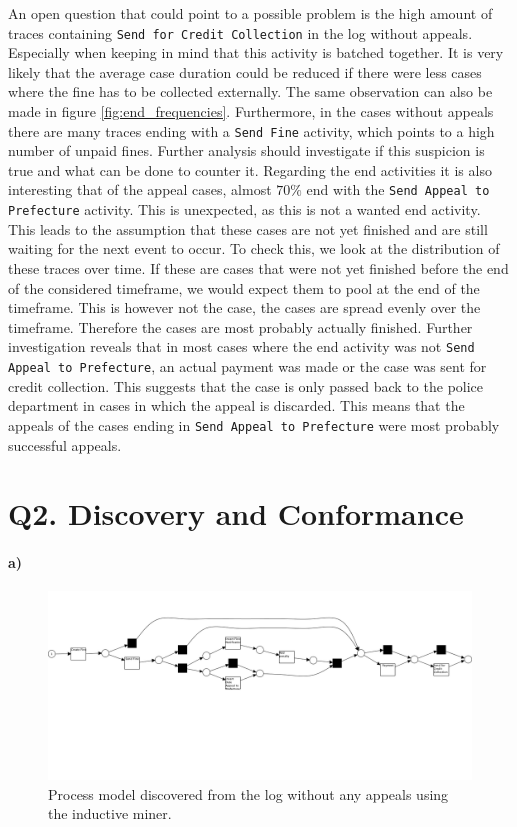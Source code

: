 \documentclass[12pt]{report}
\begin{document}
An open question that could point to a possible problem is the high amount of traces containing \texttt{Send for Credit Collection} in the log without appeals. Especially when keeping in mind that this activity is batched together. It is very likely that the average case duration could be reduced if there were less cases where the fine has to be collected externally. The same observation can also be made in figure \ref{fig:end_frequencies}. Furthermore, in the cases without appeals there are many traces ending with a \texttt{Send Fine} activity, which points to a high number of unpaid fines. Further analysis should investigate if this suspicion is true and what can be done to counter it. Regarding the end activities it is also interesting that of the appeal cases, almost $70\%$ end with the \texttt{Send Appeal to Prefecture} activity. This is unexpected, as this is not a wanted end activity. This leads to the assumption that these cases are not yet finished and are still waiting for the next event to occur. To check this, we look at the distribution of these traces over time. If these are cases that were not yet finished before the end of the considered timeframe, we would expect them to pool at the end of the timeframe. This is however not the case, the cases are spread evenly over the timeframe. Therefore the cases are most probably actually finished. Further investigation reveals that in most cases where the end activity was not \texttt{Send Appeal to Prefecture}, an actual payment was made or the case was sent for credit collection. This suggests that the case is only passed back to the police department in cases in which the appeal is discarded. This means that the appeals of the cases ending in \texttt{Send Appeal to Prefecture} were most probably successful appeals.

\section{Q2. Discovery and Conformance}

\paragraph{\textbf{a)}}
\begin{figure}[H]
  \centering
  \includegraphics[width=\textwidth]{figures/im_no_appeals.png}
  \caption{Process model discovered from the log without any appeals using the inductive miner.}
  \label{fig:im_no_appeals}
\end{figure}
\end{document}
